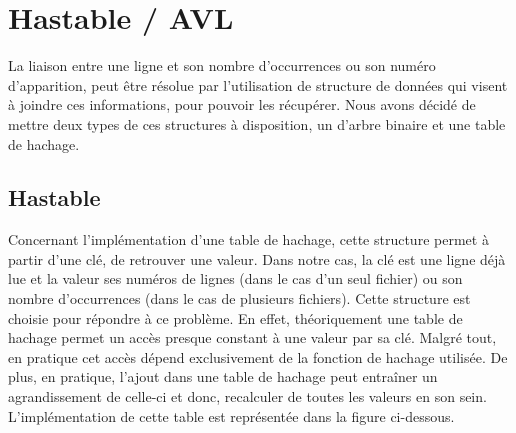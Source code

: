 \documentclass[12pt]{article}
\begin{document}
    \section{Hastable / AVL}

    La liaison entre une ligne et son nombre d'occurrences ou son numéro 
    d'apparition, peut être résolue par l'utilisation de structure de données 
    qui visent à joindre ces informations, pour pouvoir les récupérer. Nous 
    avons décidé de mettre deux types de ces structures à disposition, un 
    d'arbre binaire et une table de hachage. 

    \subsection{Hastable}

    Concernant l'implémentation d'une table de hachage, cette structure permet 
    à partir d'une clé, de retrouver une valeur. Dans notre cas, la clé est une 
    ligne déjà lue et la valeur ses numéros de lignes (dans le cas d'un seul 
    fichier) ou son nombre d'occurrences (dans le cas de plusieurs fichiers). 
    Cette structure est choisie pour répondre à ce problème. En effet, 
    théoriquement une table de hachage permet un accès presque constant à une 
    valeur par sa clé. Malgré tout, en pratique cet accès dépend exclusivement 
    de la fonction de hachage utilisée. De plus, en pratique, l'ajout dans une 
    table de hachage peut entraîner un agrandissement de celle-ci et donc, 
    recalculer de toutes les valeurs en son sein. L'implémentation de cette 
    table est représentée dans la figure ci-dessous.
    
\end{document}
